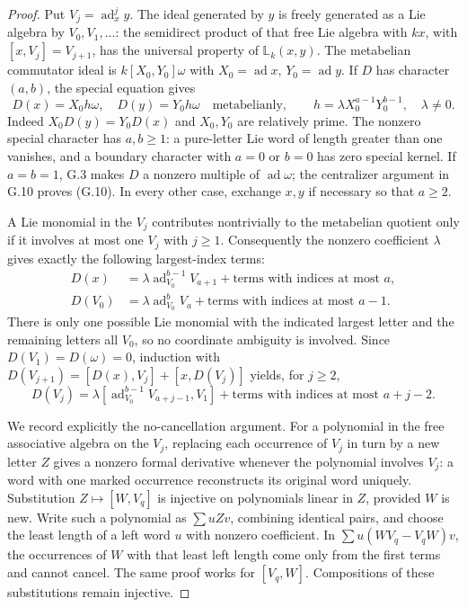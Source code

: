 \begin{proof}
Put $V_j=\operatorname{ad}_x^j y$. The ideal generated by $y$ is
freely generated as a Lie algebra by $V_0,V_1,\ldots$: the semidirect
product of that free Lie algebra with $kx$, with $[x,V_j]=V_{j+1}$,
has the universal property of $\mathbb L_k(x,y)$.
The metabelian commutator ideal is $k[X_0,Y_0]\omega$ with
$X_0=\operatorname{ad}x$, $Y_0=\operatorname{ad}y$. If $D$ has
character $(a,b)$, the special equation gives
\[
 D(x)=X_0h\omega,\quad D(y)=Y_0h\omega
 \quad\text{metabelianly},\qquad
 h=\lambda X_0^{a-1}Y_0^{b-1},\quad \lambda\ne0.
\]
Indeed $X_0D(y)=Y_0D(x)$ and $X_0,Y_0$ are relatively prime.
The nonzero special character has $a,b\ge1$: a pure-letter Lie
word of length greater than one vanishes, and a boundary character
with $a=0$ or $b=0$ has zero special kernel. If $a=b=1$, G.3
makes $D$ a nonzero multiple of $\operatorname{ad}\omega$; the
centralizer argument in G.10 proves (G.10). In every other case,
exchange $x,y$ if necessary so that $a\ge2$.

A Lie monomial in the $V_j$ contributes nontrivially to the
metabelian quotient only if it involves at most one $V_j$ with
$j\ge1$. Consequently the nonzero coefficient $\lambda$ gives
exactly the following largest-index terms:
\[
\begin{aligned}
 D(x)&=\lambda\operatorname{ad}_{V_0}^{b-1}V_{a+1}
       +\text{terms with indices at most }a,\\
 D(V_0)&=\lambda\operatorname{ad}_{V_0}^{b}V_a
       +\text{terms with indices at most }a-1.
\end{aligned}
\]
There is only one possible Lie monomial with the indicated largest
letter and the remaining letters all $V_0$, so no coordinate
ambiguity is involved. Since $D(V_1)=D(\omega)=0$, induction with
$D(V_{j+1})=[D(x),V_j]+[x,D(V_j)]$ yields, for $j\ge2$,
\[
 D(V_j)=\lambda[\operatorname{ad}_{V_0}^{b-1}V_{a+j-1},V_1]
       +\text{terms with indices at most }a+j-2.          \tag{G.11}
\]

We record explicitly the no-cancellation argument. For a polynomial
in the free associative algebra on the $V_j$, replacing each
occurrence of $V_j$ in turn by a new letter $Z$ gives a nonzero
formal derivative whenever the polynomial involves $V_j$: a word
with one marked occurrence reconstructs its original word uniquely.
Substitution $Z\mapsto[W,V_q]$ is injective on polynomials linear
in $Z$, provided $W$ is new. Write such a polynomial as $\sum uZv$,
combining identical pairs, and choose the least length of a left
word $u$ with nonzero coefficient. In
$\sum u(WV_q-V_qW)v$, the occurrences of $W$ with that least
left length come only from the first terms and cannot cancel.
The same proof works for $[V_q,W]$. Compositions of these
substitutions remain injective.


\end{proof}
